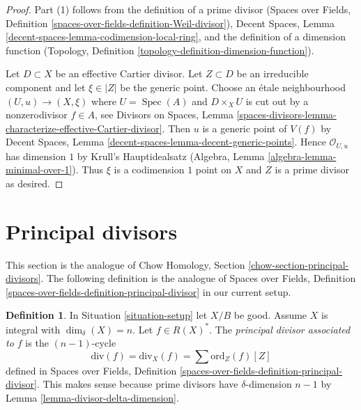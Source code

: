 \documentclass{stacks-project}
\theoremstyle{plain}
\theoremstyle{definition}
\newtheorem{definition}[subsection]{Definition}
\theoremstyle{remark}
\numberwithin{equation}{subsection}
\def\Spec{\mathop{\mathrm{Spec}}}
\begin{document}
\begin{proof}
Part (1) follows from the definition of a prime divisor
(Spaces over Fields, Definition
\ref{spaces-over-fields-definition-Weil-divisor}),
Decent Spaces, Lemma \ref{decent-spaces-lemma-codimension-local-ring},
and the definition of a dimension function
(Topology, Definition \ref{topology-definition-dimension-function}).

\medskip\noindent
Let $D \subset X$ be an effective Cartier divisor. Let $Z \subset D$
be an irreducible component and let $\xi \in |Z|$ be the generic point.
Choose an \'etale neighbourhood $(U, u) \to (X, \xi)$ where $U = \Spec(A)$
and $D \times_X U$ is cut out by a nonzerodivisor $f \in A$, see
Divisors on Spaces, Lemma
\ref{spaces-divisors-lemma-characterize-effective-Cartier-divisor}.
Then $u$ is a generic point of $V(f)$ by
Decent Spaces, Lemma \ref{decent-spaces-lemma-decent-generic-points}.
Hence $\mathcal{O}_{U, u}$ has dimension $1$ by
Krull's Hauptidealsatz (Algebra, Lemma \ref{algebra-lemma-minimal-over-1}).
Thus $\xi$ is a codimension $1$ point on $X$ and $Z$ is a prime
divisor as desired.
\end{proof}












\section{Principal divisors}
\label{section-principal-divisors}

\noindent
This section is the analogue of
Chow Homology, Section \ref{chow-section-principal-divisors}.
The following definition is the analogue of
Spaces over Fields, Definition
\ref{spaces-over-fields-definition-principal-divisor}
in our current setup.

\begin{definition}
\label{definition-principal-divisor}
In Situation \ref{situation-setup} let $X/B$ be good. Assume $X$ is
integral with $\dim_\delta(X) = n$.
Let $f \in R(X)^*$. The {\it principal divisor associated to $f$}
is the $(n - 1)$-cycle
$$
\text{div}(f) = \text{div}_X(f) = \sum \text{ord}_Z(f) [Z]
$$
defined in Spaces over Fields, Definition
\ref{spaces-over-fields-definition-principal-divisor}.
This makes sense because prime divisors have $\delta$-dimension $n - 1$ by
Lemma \ref{lemma-divisor-delta-dimension}.
\end{definition}
\end{document}

